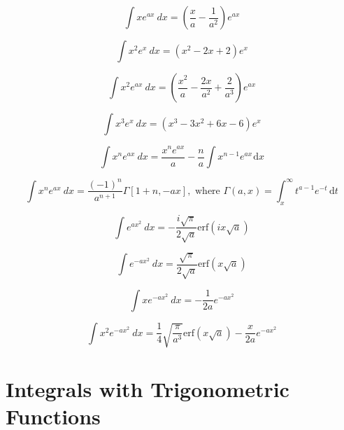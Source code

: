 \begin{equation}
\int x e^{ax}\ dx = \left(\frac{x}{a}-\frac{1}{a^2}\right) e^{ax} 
\end{equation}

\begin{equation}
\int x^2 e^{x}\ dx = \left(x^2 - 2x + 2\right) e^{x}
\end{equation}

\begin{equation}
\int x^2 e^{ax}\ dx = \left(\frac{x^2}{a}-\frac{2x}{a^2}+\frac{2}{a^3}\right) e^{ax} 
\end{equation}

\begin{equation}
\int x^3 e^{x}\ dx = \left(x^3-3x^2 + 6x - 6\right) e^{x} 
\end{equation}
 
\begin{equation}\label{eq:swift1}
\int x^n e^{ax}\ dx = \dfrac{x^n e^{ax}}{a} - 
\dfrac{n}{a}\int x^{n-1}e^{ax}\hspace{1pt}\text{d}x
\end{equation} 
 
\begin{equation}\label{eq:ebke}
\int x^n e^{ax}\ dx = \frac{(-1)^n}{a^{n+1}}\Gamma[1+n,-ax], 
 \text{ where } \Gamma(a,x)=\int_x^{\infty} t^{a-1}e^{-t}\hspace{2pt}\text{d}t
 \end{equation}

\begin{equation}\label{eq:swift2}
\int e^{ax^2}\ dx = -\frac{i\sqrt{\pi}}{2\sqrt{a}}\text{erf}\left(ix\sqrt{a}\right) 
\end{equation}

\begin{equation}\label{eq:swift3}
\int e^{-ax^2}\ dx = \frac{\sqrt{\pi}}{2\sqrt{a}}\text{erf}\left(x\sqrt{a}\right) 
\end{equation}

\begin{equation}\label{eq:qarles1}
\int x e^{-ax^2}\ {dx} = -\dfrac{1}{2a}e^{-ax^2} 
\end{equation}

\begin{equation}\label{eq:qarles2}
\int x^2 e^{-ax^2}\ {dx} = \dfrac{1}{4}\sqrt{\dfrac{\pi}{a^3}}\text{erf}(x\sqrt{a}) -\dfrac{x}{2a}e^{-ax^2}
\end{equation}


\section* {Integrals with Trigonometric Functions}

